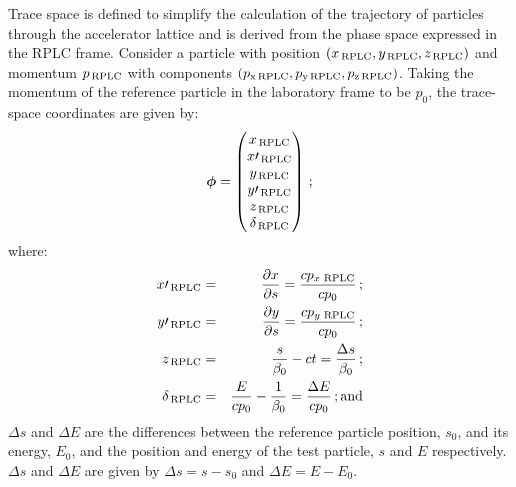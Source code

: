 Trace space is defined to simplify the calculation of the trajectory
of particles through the accelerator lattice and is derived from the
phase space expressed in the RPLC frame.
Consider a particle with position
$(x_{\rm\,RPLC}, y_{\rm\,RPLC}, z_{\rm\,RPLC})$ and momentum 
$p_{\rm\,RPLC}$ with components
$(p_{\rm x\,RPLC}, p_{\rm y\,RPLC}, p_{\rm z\,RPLC})$.
Taking the momentum of the reference particle in the laboratory frame
to be $p_0$, the trace-space coordinates are given by:
\begin{equation}
    \bm{\phi} = \begin{pmatrix}
                  x_{\rm\,RPLC}       \\
                  x\prime_{\rm\,RPLC} \\
                  y_{\rm\,RPLC}       \\
                  y\prime_{\rm\,RPLC} \\
                  z_{\rm\,RPLC}       \\
                  \delta_{\rm\,RPLC}
                \end{pmatrix} \, ;
\end{equation}
where:
\begin{eqnarray}
  x\prime_{\rm\,RPLC}  & = & \frac{\partial x}{\partial s} = \frac{cp_{x\,{\rm\,RPLC}}}{cp_0} \, ; \\
  y\prime_{\rm\,RPLC}  & = & \frac{\partial y}{\partial s} = \frac{cp_{y\,{\rm\,RPLC}}}{cp_0} \, ; \\
  z_{\rm\,RPLC}        & = & \frac{s}{\beta_0} - ct = \frac{\Delta s}{\beta_0}                    \, ; \\
  \delta_{\rm\,RPLC}   & = & \frac{E}{c p_0} - \frac{1}{\beta_0} = \frac{\Delta E}{cp_0}          \, {\rm ; and}
\end{eqnarray}
$\Delta s$ and $\Delta E$ are the differences between the reference
particle position, $s_0$, and its energy, $E_0$, and the position and
energy of the test particle, $s$ and $E$ respectively.  
$\Delta s$ and $\Delta E$ are given by $\Delta s = s - s_0$ and
$\Delta E = E - E_0$.


